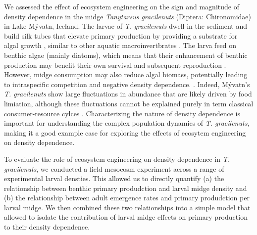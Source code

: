 We assessed the effect of ecosystem engineering on the sign and magnitude
of density dependence in the midge \emph{Tanytarsus gracilenuts} (Diptera: Chironomidae)
in Lake M\'{y}vatn, Iceland. 
The larvae of \emph{T. gracilenuts} dwell in the sediment and build silk tubes that 
elevate primary production by providing a substrate for algal growth 
\citep{herren2017, phillips2019},
similar to other aquatic macroinvertbrates 
\citep{largaespada2012,donadi2014,hoelker2015}.
The larva feed on benthic algae (mainly diatoms), 
which means that their enhancement of benthic production may benefit their own 
survival and subsequent reproduction \citep{ingvason2004, einarsson2002}.
However, midge consumption may also reduce algal biomass,
potentially leading to intraspecific competition and negative density dependence.
\citep{einarsson2016}.
Indeed, M\'{y}vatn's \emph{T. gracilenuts} show large fluctuations 
in abundance that are likely driven by food limiation,
although these fluctuations cannot be explained purely in term classical 
consumer-resource cylces \citep{ives2008}.
Characterizing the nature of density dependence is important for understanding 
the complex population dynamics of \emph{T. gracilenuts},
making it a good example case for exploring the effects of ecosytem engineering 
on density dependence.

To evaluate the role of ecosystem engineering on density dependence in \emph{T. gracilenuts},
we conducted a field mesocosm experiment across a range of experimental larval densties. 
This allowed us to directly quantify
(a) the relationship between benthic primary produdction and larval midge density and
(b) the relationship between adult emergence rates and primary produdction per larval midge.
We then combined these two relationships into a simple model 
that allowed to isolate the contribution of larval midge effects on 
primary production to their density dependence.

